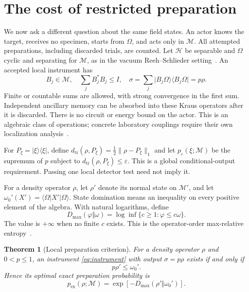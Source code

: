 \documentclass[11pt,a4paper]{article}
\newtheorem{theorem}{Theorem}
\newcommand{\M}{\mathcal M}
\newcommand{\HH}{\mathcal H}
\newcommand{\Dmax}{D_{\max}}
\newcommand{\dist}{d_{\mathrm{tr}}}
\newcommand{\ket}[1]{\lvert #1\rangle}
\newcommand{\bra}[1]{\langle #1\rvert}
\newcommand{\norm}[1]{\lVert #1\rVert}
\begin{document}
\section{The cost of restricted preparation}
\label{sec:preparation}

We now ask a different question about the same field states. An actor knows
the target, receives no specimen, starts from $\Omega$, and acts only in
$\M$. All attempted preparations, including discarded trials, are counted.
Let $\HH$ be separable and $\Omega$ cyclic and separating for $\M$,
as in the vacuum Reeh--Schlieder setting~\cite{reeh1961bemerkungen}.
An accepted local instrument has
\begin{equation}
B_j\in\M,\quad\sum_jB_j^*B_j\le I,\quad
\sigma=\sum_j\ket{B_j\Omega}\bra{B_j\Omega}=p\rho.
\label{eq:instrument}
\end{equation}
Finite or countable sums are allowed, with strong convergence in the first
sum. Independent ancillary memory can be absorbed into these Kraus
operators after it is discarded. There is no circuit or energy bound on
the actor. This is an algebraic class of operations; concrete laboratory
couplings require their own localization analysis~\cite{fewster2020measurement}.

For $P_\xi=\ket\xi\bra\xi$, define
$\dist(\rho,P_\xi)=\frac12\norm{\rho-P_\xi}_1$ and let
$p_\varepsilon(\xi;\M)$ be the supremum of $p$ subject to
$\dist(\rho,P_\xi)\le\varepsilon$. This is a global conditional-output
requirement. Passing one local detector test need not imply it.

For a density operator $\rho$, let $\rho'$ denote its normal state on
$\M'$, and let $\omega_0'(X')=\bra\Omega X'\ket\Omega$. State domination
means an inequality on every positive element of the algebra. With natural
logarithms, define
\begin{equation}
\Dmax(\varphi\Vert\omega)
=\log\inf\{c\ge1:\varphi\le c\omega\}.
\label{eq:dmax}
\end{equation}
The value is $+\infty$ when no finite $c$ exists. This is the operator-order max-relative entropy~\cite{datta2009min}.

\begin{theorem}[Local preparation criterion]
\label{thm:criterion}
For a density operator $\rho$ and $0<p\le1$, an instrument
\eqref{eq:instrument} with output $\sigma=p\rho$ exists if and only if
\begin{equation}
p\rho'\le\omega_0'.
\label{eq:domination}
\end{equation}
Hence its optimal exact preparation probability is
\begin{equation}
p_{\mathrm{ex}}(\rho;\M)
=\exp[-\Dmax(\rho'\Vert\omega_0')].
\label{eq:exact}
\end{equation}
\end{theorem}
\end{document}
